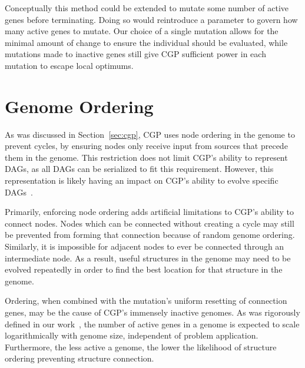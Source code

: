 \documentclass[journal]{IEEEtran}
\begin{document}
Conceptually this method could be extended to mutate some number of active genes
before terminating.  Doing so would reintroduce a parameter to govern how many
active genes to mutate.  Our choice of a single mutation allows for the minimal
amount of change to ensure the individual should be evaluated, while mutations
made to inactive genes still give CGP sufficient power in each mutation to escape
local optimums.

\section{Genome Ordering}
\label{sec:ordering}
As was discussed in Section~\ref{sec:cgp}, CGP uses node ordering in the genome
to prevent cycles, by ensuring nodes only receive input from sources that
precede them in the genome.  This restriction does not limit CGP's ability
to represent DAGs, as all DAGs can be serialized to fit this requirement.
However, this representation is likely having an impact on CGP's ability to evolve specific
DAGs~\cite{goldman:2013:ordering}.

Primarily, enforcing node ordering adds artificial limitations to CGP's ability to
connect nodes.  Nodes which can be connected without creating a cycle may
still be prevented from forming that connection because of random genome ordering.
Similarly, it is impossible for adjacent nodes
to ever be connected through an intermediate node.  As a result, useful structures
in the genome may need to be evolved repeatedly in order to find the best
location for that structure in the genome.

Ordering, when combined with the mutation's uniform resetting of connection genes, may be the cause of CGP's
immensely inactive genomes.  As was rigorously defined in our work~\cite{goldman:2013:ordering},
the number of active genes in a genome is expected to scale logarithmically
with genome size, independent of problem application.  Furthermore, the less
active a genome, the lower the likelihood of structure ordering preventing structure
connection.
\end{document}
